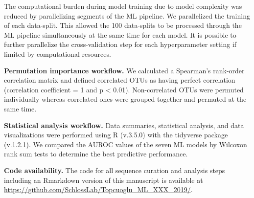 \documentclass[11pt,]{article}
\begin{document}
The computational burden during model training due to model complexity
was reduced by parallelizing segments of the ML pipeline. We
parallelized the training of each data-split. This allowed the 100
data-splits to be processed through the ML pipeline simultaneously at
the same time for each model. It is possible to further parallelize the
cross-validation step for each hyperparameter setting if limited by
computational resources.

\textbf{Permutation importance workflow.} We calculated a Spearman's
rank-order correlation matrix and defined correlated OTUs as having
perfect correlation (correlation coefficient = 1 and p \textless{}
0.01). Non-correlated OTUs were permuted individually whereas correlated
ones were grouped together and permuted at the same time.

\textbf{Statistical analysis workflow.} Data summaries, statistical
analysis, and data visualizations were performed using R (v.3.5.0) with
the tidyverse package (v.1.2.1). We compared the AUROC values of the
seven ML models by Wilcoxon rank sum tests to determine the best
predictive performance.

\textbf{Code availability.} The code for all sequence curation and
analysis steps including an Rmarkdown version of this manuscript is
available at \url{https://github.com/SchlossLab/Topcuoglu_ML_XXX_2019/}.

\newpage
\end{document}
